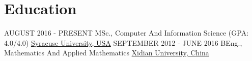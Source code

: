\documentclass[letterpaper]{twentysecondcv} %
\begin{document}
\makeprofile %

\section{Education}

\begin{twenty} %
	\twentyitemedu
    	{AUGUST 2016 - PRESENT}
        {}
        {MSc., Computer And Information Science \textnormal{(GPA: 4.0/4.0)}}
        {\href{https://www.syracuse.edu/}{Syracuse University, USA}}
        {}
        {}
	\twentyitemedu
    	{SEPTEMBER 2012 - JUNE 2016}
		{}
        {BEng., Mathematics And Applied Mathematics}
        {\href{http://en.xidian.edu.cn/}{Xidian University, China}}
        {}
        {}
\end{twenty}
\end{document}
